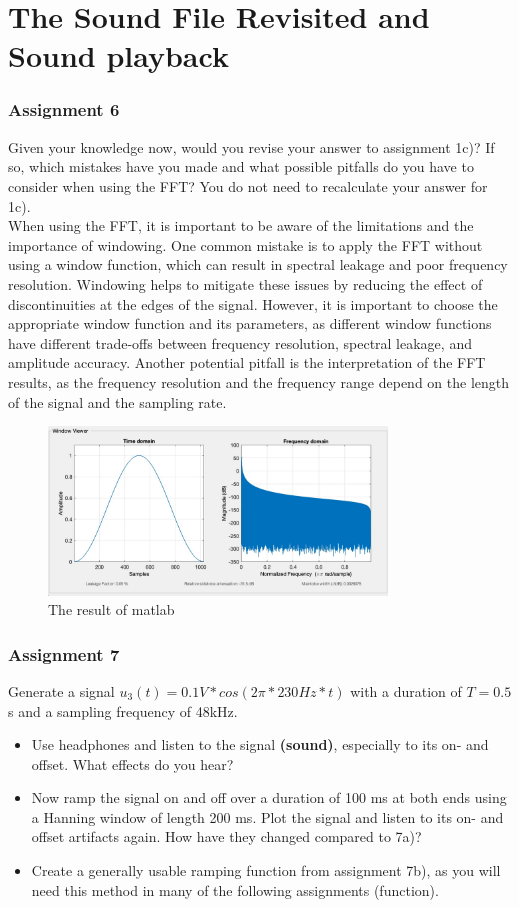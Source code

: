 \documentclass[
	a4paper,
	11pt,
]{article}
\begin{document}
\section{The Sound File Revisited and Sound playback}


\subsubsection{Assignment 6}
Given your knowledge now, would you revise your answer to assignment 1c)? If so, which mistakes have you made and what possible pitfalls do you have to consider when using the FFT? You do not need to recalculate your answer for 1c).\\

When using the FFT, it is important to be aware of the limitations and the importance of windowing. One common mistake is to apply the FFT without using a window function, which can result in spectral leakage and poor frequency resolution. Windowing helps to mitigate these issues by reducing the effect of discontinuities at the edges of the signal. However, it is important to choose the appropriate window function and its parameters, as different window functions have different trade-offs between frequency resolution, spectral leakage, and amplitude accuracy. Another potential pitfall is the interpretation of the FFT results, as the frequency resolution and the frequency range depend on the length of the signal and the sampling rate.
\\
\begin{figure}[htb!]
    \centerline{\includegraphics[width=9cm]{A67/a6.jpg}}
    \caption{The result of matlab}
\end{figure}

\subsubsection{Assignment 7}
Generate a signal \(u_3(t) = 0.1V*cos(2\pi*230Hz*t)\) with a duration of \(T =0.5\)s and a sampling frequency of 48kHz.\\
\begin{itemize}
\item Use headphones and listen to the signal \textbf{(sound)}, especially to its on- and offset. What effects do you hear?
\item Now ramp the signal on and off over a duration of 100 ms at both ends using a Hanning window of length 200 ms. Plot the signal and listen to its on- and offset artifacts again. How have they changed compared to 7a)?
\item Create a generally usable ramping function from assignment 7b), as you will need this method in many of the following assignments (function).
\end{itemize}
\end{document}
